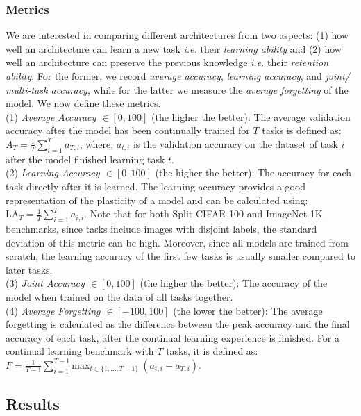 \subsubsection{Metrics} \label{sec:metrics}
We are interested in comparing different architectures from two aspects: (1) how well an architecture can learn a new task \emph{i.e.} their \emph{learning ability} and (2) how well an architecture can preserve the previous knowledge \emph{i.e.} their \emph{retention ability}. For the former, we record \emph{average accuracy}, \emph{learning accuracy}, and \emph{joint/ multi-task accuracy}, while for the latter we measure the \emph{average forgetting} of the model. We now define these metrics.\\
(1) \emph{Average Accuracy $\in [0, 100]$} (the higher the better): The average validation accuracy after the model has been continually trained for $T$ tasks is defined as:
$
    A_T= \frac{1}{T} \sum_{i=1}^T a_{T,i}
$,
where, $a_{t,i}$ is the validation accuracy on the dataset of task $i$ after the model finished learning task $t$.\\
(2) \emph{Learning Accuracy $\in [0, 100]$} (the higher the better): The accuracy for each task directly after it is learned. The learning accuracy provides a good representation of the plasticity of a model and can be calculated using: $\text{LA}_T = \frac{1}{T} \sum_{i=1}^T {a_{i, i}}$. Note that for both Split CIFAR-100 and ImageNet-1K benchmarks, since tasks include images with disjoint labels, the standard deviation of this metric can be high. Moreover, since all models are trained from scratch, the learning accuracy of the first few tasks is usually smaller compared to later tasks.\\
(3) \emph{Joint Accuracy $\in [0, 100]$} (the higher the better): The accuracy of the model when trained on the data of all tasks together.\\
(4) \emph{Average Forgetting $\in [-100, 100]$} (the lower the better): The average forgetting is calculated as the difference between the peak accuracy and the final accuracy of each task, after the continual learning experience is finished. For a continual learning benchmark with $T$ tasks, it is defined as: $F = \frac{1}{T-1} \sum_{i=1}^{T-1}{\text{max}_{t \in \{1,\dots, T-1\}}~(a_{t,i}-a_{T,i})}$.






\subsection{Results}


